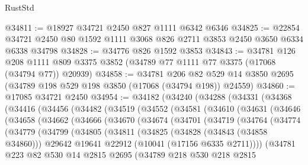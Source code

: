 \begin{lexlean}{RustStd}
\begin{coremodule}
@34811 := @18927 @34721 @2450 @827 @1111 @6342 @6346
@34825 := @22854 @34721 @2450 @80 @1592 @1111 @3068 @826 @2711 @3853 @2450 @3650 @6334 @6338 @34798
@34828 := @34776 @826 @1592 @3853
@34843 := @34781
    @126
    @208
    @1111
    @809
    @3375
    @3852
    (@34789 @77 @1111 @77 @3375 (@17068 (@34794 @77)) @20939)
@34858 := @34781
    @206
    @82
    @529
    @14
    @3850
    @2695
    (@34789 @198 @529 @198 @3850 (@17068 (@34794 @198)) @24559)
@34860 := @17085 @34721 @2450
@34954 := @34182
    (@34240
      (@34288
        (@34331
          (@34368
            (@34416
              (@34456
                (@34482
                  (@34519
                    (@34552
                      (@34581
                        (@34610
                          (@34631
                            (@34646
                              (@34658
                                (@34662
                                  (@34666
                                    (@34670
                                      (@34674
                                        (@34701
                                          (@34719
                                            (@34764
                                              (@34774
                                                (@34779
                                                  (@34799
                                                    (@34805
                                                      (@34811
                                                        (@34825
                                                          (@34828 (@34843 (@34858 @34860)))
                                                          @29642
                                                          @19641
                                                          @22912
                                                          (@10041 (@17156 @6335 @2711))))
                                                      (@34781
                                                        @223
                                                        @82
                                                        @530
                                                        @14
                                                        @2815
                                                        @2695
                                                        (@34789
                                                          @218
                                                          @530
                                                          @218
                                                          @2815

\end{coremodule}
\end{lexlean}
